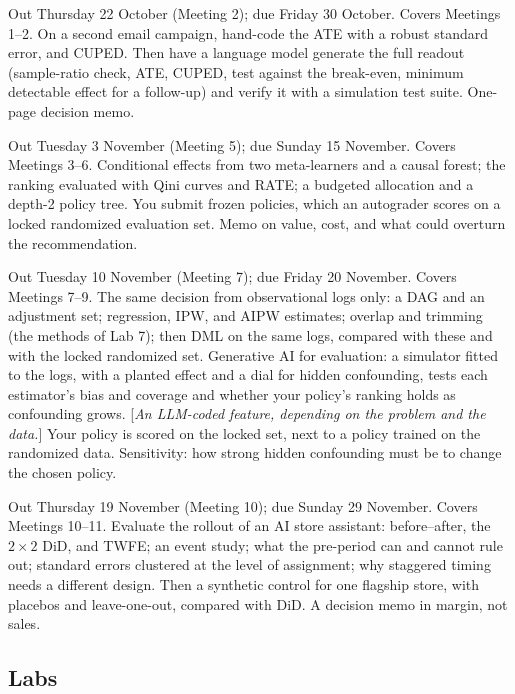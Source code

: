 \documentclass[11pt]{article}
\newcommand{\tbd}[1]{\textcolor{warnred}{[\emph{#1}]}}
\begin{document}
\begin{description}[leftmargin=1.5em, style=nextline]
\item[A1: Write once, then delegate] Out Thursday 22 October (Meeting 2); due Friday 30 October.
Covers Meetings 1--2. On a second email campaign, hand-code the ATE with a robust standard error, and
CUPED. Then have a language model generate the full readout (sample-ratio check, ATE, CUPED, test
against the break-even, minimum detectable effect for a follow-up) and verify it with a simulation
test suite. One-page decision memo.
\item[A2: Coupon whom, and at what budget?] Out Tuesday 3 November (Meeting 5); due Sunday 15
November. Covers Meetings 3--6. Conditional effects from two meta-learners and a causal forest; the
ranking evaluated with Qini curves and RATE; a budgeted allocation and a depth-2 policy tree. You
submit frozen policies, which an autograder scores on a locked randomized evaluation set. Memo on
value, cost, and what could overturn the recommendation.
\item[A3: Learn the policy from the logs] Out Tuesday 10 November (Meeting 7); due Friday 20
November. Covers Meetings 7--9. The same decision from observational logs only: a DAG and an
adjustment set; regression, IPW, and AIPW estimates; overlap and trimming (the methods of Lab 7); then
DML on the same logs, compared with these and with the locked randomized set. Generative AI for
evaluation: a simulator fitted to the logs, with a planted effect and a dial for hidden confounding,
tests each estimator's bias and coverage and whether your policy's ranking holds as confounding grows.
\tbd{An LLM-coded feature, depending on the problem and the data.} Your policy is scored on the
locked set, next to a policy trained on the randomized data. Sensitivity: how strong hidden
confounding must be to change the chosen policy.
\item[A4: Did the AI assistant pay?] Out Thursday 19 November (Meeting 10); due Sunday 29 November.
Covers Meetings 10--11. Evaluate the rollout of an AI store assistant: before--after, the $2 \times
2$ DiD, and TWFE; an event study; what the pre-period can and cannot rule out; standard errors
clustered at the level of assignment; why staggered timing needs a different design. Then a
synthetic control for one flagship store, with placebos and leave-one-out, compared with DiD. A
decision memo in margin, not sales.
\end{description}

\subsection*{Labs}
\end{document}
